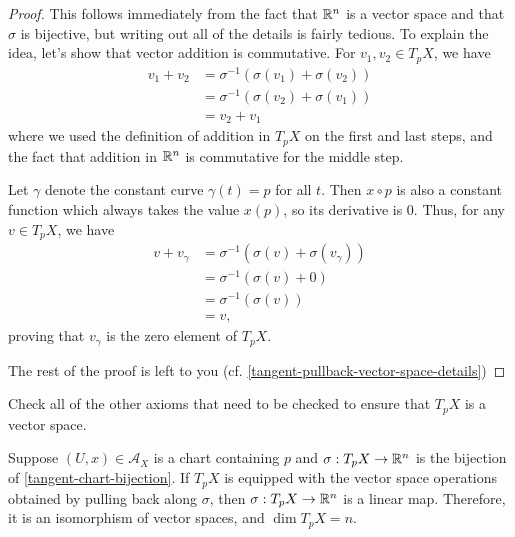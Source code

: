 \begin{proof}
	This follows immediately from the fact that $\mathbb{R}^n$ is a vector space and that $\sigma$ is bijective, but writing out all of the details is fairly tedious. To explain the idea, let's show that vector addition is commutative. For $v_1, v_2 \in T_p X$, we have
	\[ \begin{aligned} v_1 + v_2 &= \sigma^{-1}(\sigma(v_1) + \sigma(v_2)) \\ &= \sigma^{-1}(\sigma(v_2) + \sigma(v_1)) \\ &= v_2 + v_1 \end{aligned} \]
	where we used the definition of addition in $T_p X$ on the first and last steps, and the fact that addition in $\mathbb{R}^n$ is commutative for the middle step. 
	
	Let $\gamma$ denote the constant curve $\gamma(t) = p$ for all $t$. Then $x \circ p$ is also a constant function which always takes the value $x(p)$, so its derivative is 0. Thus, for any $v \in T_p X$, we have
	\[ \begin{aligned} v + v_\gamma &= \sigma^{-1}(\sigma(v) + \sigma(v_\gamma)) \\ &= \sigma^{-1}(\sigma(v) + 0) \\ &= \sigma^{-1}(\sigma(v)) \\ &= v, \end{aligned} \]
	proving that $v_\gamma$ is the zero element of $T_p X$. 
	
	The rest of the proof is left to you (cf. \cref{tangent-pullback-vector-space-details})
\end{proof}

\begin{exercise} \label{tangent-pullback-vector-space-details}
	Check all of the other axioms that need to be checked to ensure that $T_p X$ is a vector space.\footnotemark
\end{exercise}


\begin{exercise} \label{pulling-back-makes-linear}
	Suppose $(U, x) \in \mathscr{A}_X$ is a chart containing $p$ and $\sigma : T_p X \to \mathbb{R}^n$ is the bijection of \cref{tangent-chart-bijection}. If $T_p X$ is equipped with the vector space operations obtained by pulling back along $\sigma$, then $\sigma : T_p X \to \mathbb{R}^n$ is a linear map. Therefore, it is an isomorphism of vector spaces, and $\dim T_p X = n$. 
\end{exercise}

